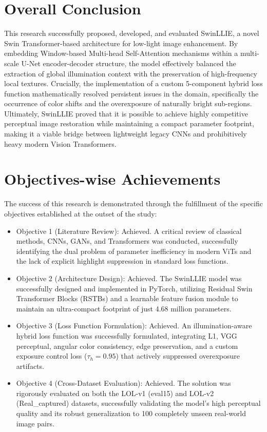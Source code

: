\documentclass[12pt, a4paper]{report}
\begin{document}
\section{Overall Conclusion}
This research successfully proposed, developed, and evaluated SwinLLIE, a novel Swin Transformer-based architecture for low-light image enhancement. By embedding Window-based Multi-head Self-Attention mechanisms within a multi-scale U-Net encoder-decoder structure, the model effectively balanced the extraction of global illumination context with the preservation of high-frequency local textures. Crucially, the implementation of a custom 5-component hybrid loss function mathematically resolved persistent issues in the domain, specifically the occurrence of color shifts and the overexposure of naturally bright sub-regions. Ultimately, SwinLLIE proved that it is possible to achieve highly competitive perceptual image restoration while maintaining a compact parameter footprint, making it a viable bridge between lightweight legacy CNNs and prohibitively heavy modern Vision Transformers.

\section{Objectives-wise Achievements}
The success of this research is demonstrated through the fulfillment of the specific objectives established at the outset of the study:
\begin{itemize}
    \item Objective 1 (Literature Review): Achieved. A critical review of classical methods, CNNs, GANs, and Transformers was conducted, successfully identifying the dual problem of parameter inefficiency in modern ViTs and the lack of explicit highlight suppression in standard loss functions.
    \item Objective 2 (Architecture Design): Achieved. The SwinLLIE model was successfully designed and implemented in PyTorch, utilizing Residual Swin Transformer Blocks (RSTBs) and a learnable feature fusion module to maintain an ultra-compact footprint of just 4.68 million parameters.
    \item Objective 3 (Loss Function Formulation): Achieved. An illumination-aware hybrid loss function was successfully formulated, integrating L1, VGG perceptual, angular color consistency, edge preservation, and a custom exposure control loss ($\tau_h = 0.95$) that actively suppressed overexposure artifacts.
    \item Objective 4 (Cross-Dataset Evaluation): Achieved. The solution was rigorously evaluated on both the LOL-v1 (eval15) and LOL-v2 (Real\_captured) datasets, successfully validating the model's high perceptual quality and its robust generalization to 100 completely unseen real-world image pairs.
\end{itemize}
\end{document}

